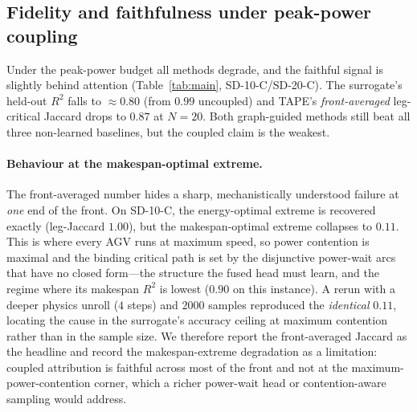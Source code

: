 \documentclass[11pt]{article}
\begin{document}
\subsection{Fidelity and faithfulness under peak-power coupling}
Under the peak-power budget all methods degrade, and the faithful signal is slightly behind
attention (Table~\ref{tab:main}, \textsf{SD-10-C}/\textsf{SD-20-C}). The surrogate's
held-out $R^2$ falls to $\approx0.80$ (from $0.99$ uncoupled) and TAPE's \emph{front-averaged}
leg-critical Jaccard drops to $0.87$ at $N=20$. Both graph-guided methods still beat all three
non-learned baselines, but the coupled claim is the weakest.

\paragraph{Behaviour at the makespan-optimal extreme.} The front-averaged number hides a
sharp, mechanistically understood failure at \emph{one} end of the front. On
\textsf{SD-10-C}, the energy-optimal extreme is recovered exactly (leg-Jaccard
$1.00$), but the makespan-optimal extreme collapses to $0.11$. This is where every AGV runs
at maximum speed, so power contention is maximal and the binding critical path is set by the
disjunctive power-wait arcs that have no closed form---the structure the fused head must
learn, and the regime where its makespan $R^2$ is lowest ($0.90$ on this instance).
A rerun with a deeper physics unroll ($4$ steps) and $2000$ samples reproduced the
\emph{identical} $0.11$, locating the cause in the surrogate's accuracy ceiling at maximum
contention rather than in the sample size. We therefore report the front-averaged Jaccard as
the headline and record the makespan-extreme degradation as a limitation: coupled
attribution is faithful across most of the front and not at the maximum-power-contention
corner, which a richer power-wait head or contention-aware sampling would address.
\end{document}
